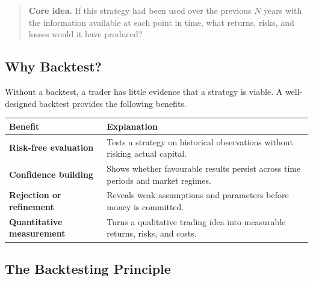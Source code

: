 \documentclass[12pt,openany]{book}
\theoremstyle{definition}
\theoremstyle{remark}
\begin{document}
\begin{quote}
\colorbox{diagramBlue!8}{%
\parbox{\dimexpr\linewidth-2\fboxsep\relax}{%
\textbf{Core idea.} If this strategy had been used over the previous \(N\)
years with the information available at each point in time, what returns,
risks, and losses would it have produced?}}
\end{quote}

\subsection{Why Backtest?}

Without a backtest, a trader has little evidence that a strategy is viable.
A well-designed backtest provides the following benefits.

\begin{center}
\small
\begin{tabular}{|L{0.25\textwidth}|L{0.62\textwidth}|}
\hline
\textbf{Benefit} & \textbf{Explanation} \\ \hline
\textbf{Risk-free evaluation} &
Tests a strategy on historical observations without risking actual capital. \\ \hline
\textbf{Confidence building} &
Shows whether favourable results persist across time periods and market regimes. \\ \hline
\textbf{Rejection or refinement} &
Reveals weak assumptions and parameters before money is committed. \\ \hline
\textbf{Quantitative measurement} &
Turns a qualitative trading idea into measurable returns, risks, and costs. \\ \hline
\end{tabular}
\end{center}

\subsection{The Backtesting Principle}
\end{document}
